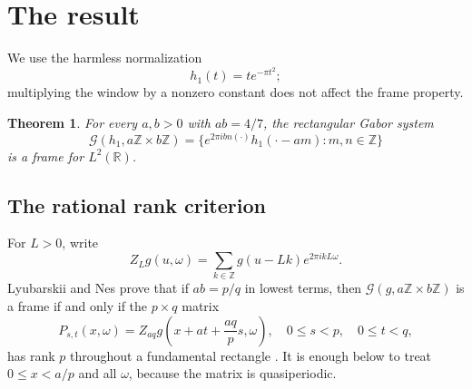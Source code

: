 \documentclass[11pt]{article}
\newtheorem{theorem}{Theorem}
\newcommand{\R}{\mathbb R}
\newcommand{\Z}{\mathbb Z}
\newcommand{\G}{\mathcal G}
\begin{document}
\section{The result}
We use the harmless normalization
\[
 h_1(t)=t e^{-\pi t^2};
\]
multiplying the window by a nonzero constant does not affect the frame
property.

\begin{theorem}\label{thm:main}
For every $a,b>0$ with $ab=4/7$, the rectangular Gabor system
\[
 \G(h_1,a\Z\times b\Z)
 =\{e^{2\pi i b n(\cdot)}h_1(\cdot-am):m,n\in\Z\}
\]
is a frame for $L^2(\R)$.
\end{theorem}

\subsection{The rational rank criterion}
For $L>0$, write
\[
 Z_Lg(u,\omega)=\sum_{k\in\Z}g(u-Lk)e^{2\pi i kL\omega}.
\]
Lyubarskii and Nes prove that if $ab=p/q$ in lowest terms, then
$\G(g,a\Z\times b\Z)$ is a frame if and only if the $p\times q$ matrix
\begin{equation}\label{eq:P}
 P_{s,t}(x,\omega)
 =Z_{aq}g\!\left(x+at+\frac{aq}{p}s,\omega\right),
 \quad 0\le s<p,\quad0\le t<q,
\end{equation}
has rank $p$ throughout a fundamental rectangle
\cite[Theorem 2]{LN}.  It is enough below to treat $0\le x<a/p$ and all
$\omega$, because the matrix is quasiperiodic.
\end{document}
